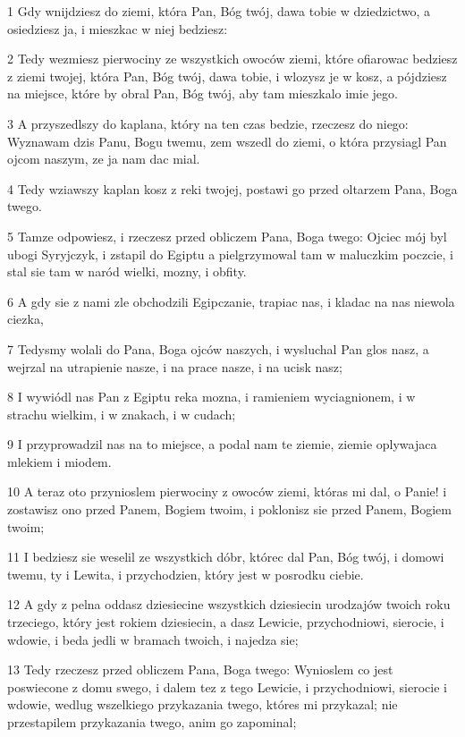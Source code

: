 \par 1 Gdy wnijdziesz do ziemi, która Pan, Bóg twój, dawa tobie w dziedzictwo, a osiedziesz ja, i mieszkac w niej bedziesz:
\par 2 Tedy wezmiesz pierwociny ze wszystkich owoców ziemi, które ofiarowac bedziesz z ziemi twojej, która Pan, Bóg twój, dawa tobie, i wlozysz je w kosz, a pójdziesz na miejsce, które by obral Pan, Bóg twój, aby tam mieszkalo imie jego.
\par 3 A przyszedlszy do kaplana, który na ten czas bedzie, rzeczesz do niego: Wyznawam dzis Panu, Bogu twemu, zem wszedl do ziemi, o która przysiagl Pan ojcom naszym, ze ja nam dac mial.
\par 4 Tedy wziawszy kaplan kosz z reki twojej, postawi go przed oltarzem Pana, Boga twego.
\par 5 Tamze odpowiesz, i rzeczesz przed obliczem Pana, Boga twego: Ojciec mój byl ubogi Syryjczyk, i zstapil do Egiptu a pielgrzymowal tam w maluczkim poczcie, i stal sie tam w naród wielki, mozny, i obfity.
\par 6 A gdy sie z nami zle obchodzili Egipczanie, trapiac nas, i kladac na nas niewola ciezka,
\par 7 Tedysmy wolali do Pana, Boga ojców naszych, i wysluchal Pan glos nasz, a wejrzal na utrapienie nasze, i na prace nasze, i na ucisk nasz;
\par 8 I wywiódl nas Pan z Egiptu reka mozna, i ramieniem wyciagnionem, i w strachu wielkim, i w znakach, i w cudach;
\par 9 I przyprowadzil nas na to miejsce, a podal nam te ziemie, ziemie oplywajaca mlekiem i miodem.
\par 10 A teraz oto przynioslem pierwociny z owoców ziemi, któras mi dal, o Panie! i zostawisz ono przed Panem, Bogiem twoim, i poklonisz sie przed Panem, Bogiem twoim;
\par 11 I bedziesz sie weselil ze wszystkich dóbr, którec dal Pan, Bóg twój, i domowi twemu, ty i Lewita, i przychodzien, który jest w posrodku ciebie.
\par 12 A gdy z pelna oddasz dziesiecine wszystkich dziesiecin urodzajów twoich roku trzeciego, który jest rokiem dziesiecin, a dasz Lewicie, przychodniowi, sierocie, i wdowie, i beda jedli w bramach twoich, i najedza sie;
\par 13 Tedy rzeczesz przed obliczem Pana, Boga twego: Wynioslem co jest poswiecone z domu swego, i dalem tez z tego Lewicie, i przychodniowi, sierocie i wdowie, wedlug wszelkiego przykazania twego, któres mi przykazal; nie przestapilem przykazania twego, anim go zapominal;
